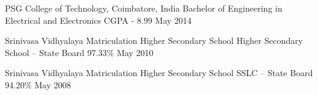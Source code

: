 
\begin{cvhonors}

  \cvhonor
    {PSG College of Technology, Coimbatore, India} %
    {Bachelor of Engineering in Electrical and Electronics} %
    {CGPA - 8.99} %
    {May 2014} %

  \cvhonor
    {Srinivasa Vidhyalaya Matriculation Higher Secondary School} %
    {Higher Secondary School – State Board} %
    {97.33\%} %
    {May 2010} %

  \cvhonor
    {Srinivasa Vidhyalaya Matriculation Higher Secondary School} %
    {SSLC – State Board} %
    {94.20\%} %
    {May 2008} %

\end{cvhonors}
